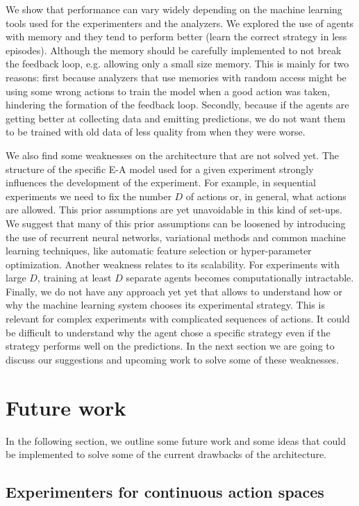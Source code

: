 \documentclass[11pt,a4paper,twoside]{report}
\newcommand{\+}{\textnormal{+} }
\theoremstyle{definition}
\numberwithin{equation}{chapter}
\begin{document}
We show that performance can vary widely depending on the machine learning tools
used for the experimenters and the analyzers. We explored the use of agents with
memory and they tend to perform better (learn the correct strategy in less
episodes). Although the memory should be carefully implemented to not break the
feedback loop, e.g. allowing only a small size memory. This is mainly for two
reasons: first because analyzers that use memories with random access might be
using some wrong actions to train the model when a good action was taken,
hindering the formation of the feedback loop. Secondly, because if the agents are
getting better at collecting data and emitting predictions, we do not want them
to be trained with old data of less quality from when they were worse.

We also find some weaknesses on the architecture that are not solved yet. The
structure of the specific E-A model used for a given experiment strongly
influences the development of the experiment. For example, in sequential
experiments we need to fix the number $D$ of actions or, in general, what
actions are allowed. This prior assumptions are yet unavoidable in this kind of
set-ups. We suggest that many of this prior assumptions can be loosened by
introducing the use of recurrent neural networks, variational methods and common
machine learning techniques, like automatic feature selection or hyper-parameter
optimization. Another weakness relates to its scalability. For experiments with
large $D$, training at least $D$ separate agents becomes computationally
intractable. Finally, we do not have any approach yet yet that allows to
understand how or why the machine learning system chooses its experimental
strategy. This is relevant for complex experiments with complicated sequences of
actions. It could be difficult to understand why the agent chose a specific
strategy even if the strategy performs well on the predictions. In the next
section we are going to discuss our suggestions and upcoming work to solve some
of these weaknesses.

\section{Future work}

In the following section, we outline some future work and some ideas that could
be implemented to solve some of the current drawbacks of the architecture.

\subsection{Experimenters for continuous action spaces}
\end{document}
